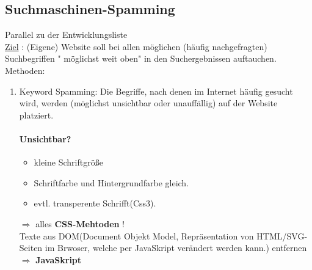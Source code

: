 \subsection{Suchmaschinen-Spamming}
Parallel zu der Entwicklungsliste\\
\underline{Ziel} : (Eigene) Website soll bei allen möglichen (häufig nachgefragten) Suchbegriffen " möglichst weit oben" in den Suchergebnissen auftauchen. 
Methoden:
\begin{enumerate}
\item Keyword Spamming: Die Begriffe, nach denen im Internet häufig gesucht wird, werden (möglichst unsichtbar oder unauffällig) auf der Website platziert.
 \paragraph{Unsichtbar?}
 \begin{itemize}
 \item kleine Schriftgröße
 \item Schriftfarbe und Hintergrundfarbe gleich.
 \item evtl. transperente Schrifft(Css3).
 \end{itemize}
$\Rightarrow$ alles \textbf{CSS-Mehtoden} !\\
Texte aus DOM(Document Objekt Model, Repräsentation von HTML/SVG-Seiten im Brwoser, welche per JavaSkript verändert werden kann.) entfernen $\Rightarrow$ \textbf{JavaSkript}
\end{enumerate}

